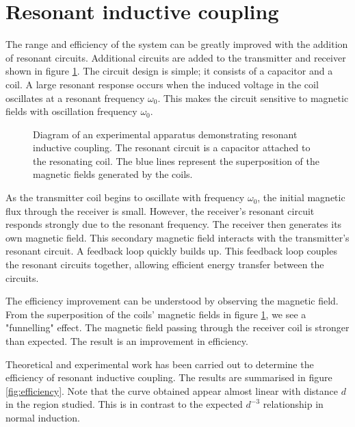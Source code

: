 \documentclass[a4paper,justified,nobib]{tufte-handout}
\begin{document}
\section{Resonant inductive coupling}

The range and efficiency of the system can be greatly improved with the addition of
resonant circuits.
Additional circuits are added to the transmitter and receiver shown in figure
\ref{fig:setupresonance}.
The circuit design is simple; it consists of a capacitor and a coil.
A large resonant response occurs when the induced voltage in the coil oscillates
at a resonant frequency $\omega_0$.
This makes the circuit sensitive to magnetic fields with oscillation
frequency $\omega_0$.

\begin{figure}
  \center
  
  \caption{Diagram of an experimental apparatus demonstrating resonant inductive coupling.
    The resonant circuit is a capacitor attached to the resonating coil.
    The blue lines represent the superposition of the magnetic fields generated by the coils.}
    \label{fig:setupresonance}
\end{figure}


As the transmitter coil begins to oscillate with frequency $\omega_0$,
the initial magnetic flux through the receiver is small.
However, the receiver's resonant circuit responds strongly due to the resonant frequency.
The receiver then generates its own magnetic field.
This secondary magnetic field interacts with the transmitter's resonant circuit.
A feedback loop quickly builds up.
This feedback loop couples the resonant circuits together,
allowing efficient energy transfer between the circuits.

The efficiency improvement can be understood by observing the magnetic field.
From the superposition of the coils' magnetic fields in figure 
\ref{fig:setupresonance},
we see a "funnelling" effect.
The magnetic field passing through the receiver coil is stronger than expected.
The result is an improvement in efficiency.\cite{Efficient}

Theoretical and experimental work has been carried out to determine the
efficiency of resonant inductive coupling.\cite{Efficient}\cite{StrongCouple} 
The results are summarised in figure \ref{fig:efficiency}.
Note that the curve obtained appear almost linear with distance $d$
in the region studied.
This is in contrast to the expected $d^{-3}$ relationship in normal induction.
\end{document}
